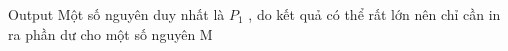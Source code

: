 Output
Một số nguyên duy nhất là $P_{1}$   , do kết quả có thể rất lớn nên chỉ cần in ra phần dư cho một số nguyên M